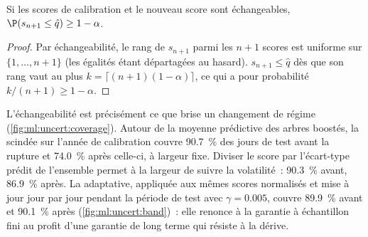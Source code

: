 \begin{theorem}\label{thm:ml:uncert:conformal}
Si les scores de calibration et le nouveau score sont échangeables, $\P(s_{n+1}\le\hat q)\ge1 - \alpha$.
\end{theorem}

\begin{proof}
Par échangeabilité, le rang de $s_{n+1}$ parmi les $n + 1$ scores est uniforme sur $\{1,\dots,n+1\}$ (les égalités étant départagées au hasard).
$s_{n+1}\le\hat q$ dès que son rang vaut au plus $k = \lceil(n+1)(1-\alpha)\rceil$, ce qui a pour probabilité
$k/(n+1)\ge1 - \alpha$.
\end{proof}

L'échangeabilité est précisément ce que brise un changement de régime (\cref{fig:ml:uncert:coverage}). Autour de la moyenne
prédictive des arbres boostés, la  scindée sur l'année de calibration couvre 90.7~\% des jours de test avant la rupture et 74.0~\% après celle-ci,
à largeur fixe. Diviser le score par l'écart-type prédit de l'ensemble permet à la largeur de suivre la volatilité~:
90.3~\% avant, 86.9~\% après. La  adaptative, appliquée aux mêmes scores normalisés et mise à jour jour par jour pendant la
période de test avec $\gamma = 0.005$, couvre 89.9~\% avant et 90.1~\% après (\cref{fig:ml:uncert:band})~: elle renonce à la
garantie à échantillon fini au profit d'une garantie de long terme qui résiste à la dérive.

